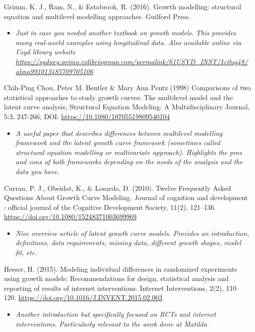 \documentclass[
]{book}
\providecommand{\tightlist}{%
  \setlength{\itemsep}{0pt}\setlength{\parskip}{0pt}}
\begin{document}
Grimm, K. J., Ram, N., \& Estabrook, R. (2016). Growth modelling: structural equation and multilevel modelling approaches. Guilford Press.

\begin{itemize}
\tightlist
\item
  \emph{Just in case you needed another textbook on growth models. This provides many real-world examples using longitudinal data. Also available online via Usyd library website \url{https://sydney.primo.exlibrisgroup.com/permalink/61USYD_INST/1c0ug48/alma991013485709705106}}
\end{itemize}

Chih‐Ping Chou, Peter M. Bentler \& Mary Ann Pentz (1998) Comparisons of two statistical approaches to study growth curves: The multilevel model and the latent curve analysis, Structural Equation Modeling: A Multidisciplinary Journal, 5:3, 247-266, DOI: \url{https://10.1080/10705519809540104}

\begin{itemize}
\tightlist
\item
  \emph{A useful paper that describes differences between multilevel modelling framework and the latent growth curve framework (sometimes called structural equation modelling or multivariate approach). Highlights the pros and cons of both frameworks depending on the needs of the analysis and the data you have. }
\end{itemize}

Curran, P. J., Obeidat, K., \& Losardo, D. (2010). Twelve Frequently Asked Questions About Growth Curve Modeling. Journal of cognition and development : official journal of the Cognitive Development Society, 11(2), 121--136. \url{https://doi.org/10.1080/15248371003699969}

\begin{itemize}
\tightlist
\item
  \emph{Nice overview article of latent growth curve models. Provides an introduction, definitions, data requirements, missing data, different growth shapes, model fit, etc. }
\end{itemize}

Hesser, H. (2015). Modeling individual differences in randomized experiments using growth models: Recommendations for design, statistical analysis and reporting of results of internet interventions. Internet Interventions, 2(2), 110--120. \url{https://doi.org/10.1016/J.INVENT.2015.02.003}

\begin{itemize}
\tightlist
\item
  \emph{Another introduction but specifically focused on RCTs and internet interventions. Particularly relevant to the work done at Matilda.}
\end{itemize}
\end{document}
